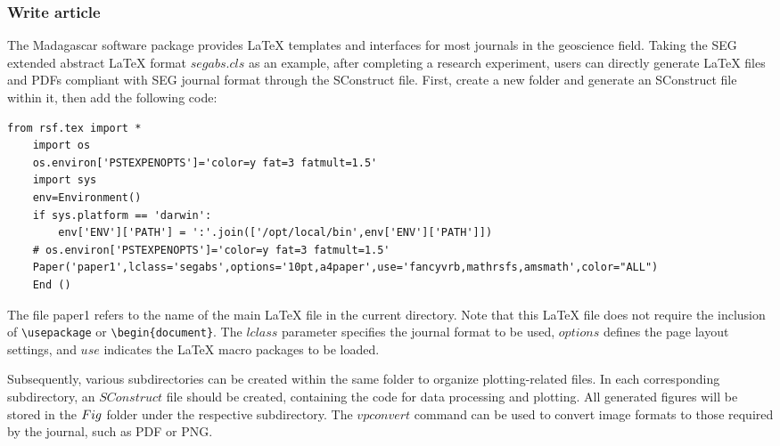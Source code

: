 \subsubsection{Write article}
The Madagascar software package provides LaTeX templates and interfaces for most journals in the geoscience field. Taking the SEG extended abstract LaTeX format $segabs.cls$ as an example, after completing a research experiment, users can directly generate LaTeX files and PDFs compliant with SEG journal format through the SConstruct file. First, create a new folder and generate an SConstruct file within it, then add the following code:
\begin{lstlisting}[frame=single, breaklines=true, basicstyle=\ttfamily\small]
    from rsf.tex import *
    import os
    os.environ['PSTEXPENOPTS']='color=y fat=3 fatmult=1.5'
    import sys
    env=Environment()
    if sys.platform == 'darwin':
        env['ENV']['PATH'] = ':'.join(['/opt/local/bin',env['ENV']['PATH']])
    # os.environ['PSTEXPENOPTS']='color=y fat=3 fatmult=1.5'
    Paper('paper1',lclass='segabs',options='10pt,a4paper',use='fancyvrb,mathrsfs,amsmath',color="ALL")
    End ()
\end{lstlisting}
The file paper1 refers to the name of the main LaTeX file in the current directory. Note that this LaTeX file does not require the inclusion of \texttt{\textbackslash usepackage} or \texttt{\textbackslash begin\{document\}}. The $lclass$ parameter specifies the journal format to be used, $options$ defines the page layout settings, and $use$ indicates the LaTeX macro packages to be loaded.

Subsequently, various subdirectories can be created within the same folder to organize plotting-related files. In each corresponding subdirectory, an $SConstruct$ file should be created, containing the code for data processing and plotting. All generated figures will be stored in the $\\Fig$ folder under the respective subdirectory. The $vpconvert$ command can be used to convert image formats to those required by the journal, such as PDF or PNG.

